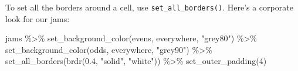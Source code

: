 \documentclass[
]{article}
\newenvironment{Shaded}{\begin{snugshade}}{\end{snugshade}}
\newcommand{\DecValTok}[1]{\textcolor[rgb]{0.00,0.00,0.81}{#1}}
\newcommand{\FloatTok}[1]{\textcolor[rgb]{0.00,0.00,0.81}{#1}}
\newcommand{\FunctionTok}[1]{\textcolor[rgb]{0.00,0.00,0.00}{#1}}
\newcommand{\NormalTok}[1]{#1}
\newcommand{\SpecialCharTok}[1]{\textcolor[rgb]{0.00,0.00,0.00}{#1}}
\newcommand{\StringTok}[1]{\textcolor[rgb]{0.31,0.60,0.02}{#1}}
\begin{document}
\FloatBarrier

To set all the borders around a cell, use \texttt{set\_all\_borders()}.
Here's a corporate look for our jams:

\begin{Shaded}
\begin{Highlighting}[]
\NormalTok{jams }\SpecialCharTok{\%\textgreater{}\%} 
      \FunctionTok{set\_background\_color}\NormalTok{(evens, everywhere, }\StringTok{"grey80"}\NormalTok{) }\SpecialCharTok{\%\textgreater{}\%} 
      \FunctionTok{set\_background\_color}\NormalTok{(odds, everywhere, }\StringTok{"grey90"}\NormalTok{) }\SpecialCharTok{\%\textgreater{}\%} 
      \FunctionTok{set\_all\_borders}\NormalTok{(}\FunctionTok{brdr}\NormalTok{(}\FloatTok{0.4}\NormalTok{, }\StringTok{"solid"}\NormalTok{, }\StringTok{"white"}\NormalTok{)) }\SpecialCharTok{\%\textgreater{}\%} 
      \FunctionTok{set\_outer\_padding}\NormalTok{(}\DecValTok{4}\NormalTok{)}
\end{Highlighting}
\end{Shaded}

 
  \providecommand{\huxb}[2]{\arrayrulecolor[RGB]{#1}\global\arrayrulewidth=#2pt}
  \providecommand{\huxvb}[2]{\color[RGB]{#1}\vrule width #2pt}
  \providecommand{\huxtpad}[1]{\rule{0pt}{#1}}
  \providecommand{\huxbpad}[1]{\rule[-#1]{0pt}{#1}}
\end{document}
